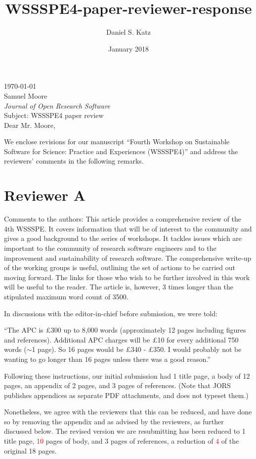 \documentclass[11pt]{article}
\title{WSSSPE4-paper-reviewer-response}
\author{Daniel S. Katz}
\date{January 2018}
\begin{document}
\today\\

Samuel Moore\\
\textit{Journal of Open Research Software}\\

Subject: WSSSPE4 paper review\\

Dear Mr. Moore,

We enclose revisions for our manuscript ``Fourth Workshop on Sustainable Software for Science: Practice and Experiences
(WSSSPE4)'' and address the reviewers' comments in the following remarks.


\section*{Reviewer A}

\begin{quoting}
Comments to the authors: 
This article provides a comprehensive review of the 4th WSSSPE.  It covers information that will be of interest to the community and gives a good background to the series of workshops.  It tackles issues which are important to the community of research software engineers and to the improvement and sustainability of research software.
The comprehensive write-up of the working groups is useful, outlining the set of actions to be carried out moving forward. The links for those who wish to be further involved in this work will be useful to the reader.
The article is, however, 3 times longer than the stipulated maximum word count of 3500. 
\end{quoting}

In discussions with the editor-in-chief before submission, we were told:

``The APC is \pounds300 up to 8,000 words (approximately 12 pages including
figures and references). Additional APC charges will be \pounds10 for every
additional 750 words ($\sim$1 page).
So 16 pages would be \pounds340 - \pounds350. I would probably not be wanting to
go longer than 16 pages unless there was a good reason.''

Following these instructions, our initial submission had 1 title page, a body of 12 pages, an appendix of 2 pages, and 3 pages of references. (Note that JORS publishes appendices as separate PDF attachments, and does not typeset them.)

Nonetheless, we agree with the reviewers that this can be reduced, and have done so by removing the appendix and as advised by the reviewers, as further discussed below.  The revised version we are resubmitting has been reduced to 1 title page, \textcolor{red}{10} pages of body, and 3 pages of references, a reduction of \textcolor{red}{4} of the original 18 pages.
\end{document}
